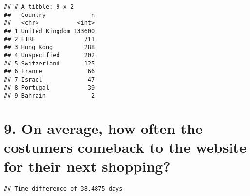 \documentclass[
]{article}
\newenvironment{Shaded}{\begin{snugshade}}{\end{snugshade}}
\newcommand{\AttributeTok}[1]{\textcolor[rgb]{0.77,0.63,0.00}{#1}}
\newcommand{\CommentTok}[1]{\textcolor[rgb]{0.56,0.35,0.01}{\textit{#1}}}
\newcommand{\FunctionTok}[1]{\textcolor[rgb]{0.00,0.00,0.00}{#1}}
\newcommand{\NormalTok}[1]{#1}
\newcommand{\OtherTok}[1]{\textcolor[rgb]{0.56,0.35,0.01}{#1}}
\newcommand{\SpecialCharTok}[1]{\textcolor[rgb]{0.00,0.00,0.00}{#1}}
\begin{document}
\begin{verbatim}
## # A tibble: 9 x 2
##   Country             n
##   <chr>           <int>
## 1 United Kingdom 133600
## 2 EIRE              711
## 3 Hong Kong         288
## 4 Unspecified       202
## 5 Switzerland       125
## 6 France             66
## 7 Israel             47
## 8 Portugal           39
## 9 Bahrain             2
\end{verbatim}

\hypertarget{on-average-how-often-the-costumers-comeback-to-the-website-for-their-next-shopping}{%
\section{9. On average, how often the costumers comeback to the website
for their next
shopping?}\label{on-average-how-often-the-costumers-comeback-to-the-website-for-their-next-shopping}}

\begin{Shaded}
\end{Shaded}

\begin{verbatim}
## Time difference of 38.4875 days
\end{verbatim}
\end{document}
